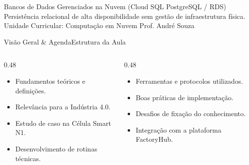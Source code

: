 
\senaicover
  {Bancos de Dados Gerenciados na Nuvem (Cloud SQL PostgreSQL / RDS)}
  {Persistência relacional de alta disponibilidade sem gestão de infraestrutura física.}
  {Unidade Curricular: Computação em Nuvem}
  {Prof. André Souza}

\begin{senaiframe}{Visão Geral \& Agenda}{Estrutura da Aula}
  \begin{columns}[t]
    \begin{column}{0.48\textwidth}
      \begin{tcolorbox}[senaibluecard, title={1. Conceitos Chave}]
        \begin{itemize}
          \item Fundamentos teóricos e definições.
          \item Relevância para a Indústria 4.0.
        \end{itemize}
      \end{tcolorbox}
      \vspace{4pt}
      \begin{tcolorbox}[senaiambercard, title={3. Aplicação Prática}]
        \begin{itemize}
          \item Estudo de caso na Célula Smart N1.
          \item Desenvolvimento de rotinas técnicas.
        \end{itemize}
      \end{tcolorbox}
    \end{column}
    \begin{column}{0.48\textwidth}
      \begin{tcolorbox}[senairedcard, title={2. Detalhamento Técnico}]
        \begin{itemize}
          \item Ferramentas e protocolos utilizados.
          \item Boas práticas de implementação.
        \end{itemize}
      \end{tcolorbox}
      \vspace{4pt}
      \begin{tcolorbox}[senaigreencard, title={4. Exercícios \& Avaliação}]
        \begin{itemize}
          \item Desafios de fixação do conhecimento.
          \item Integração com a plataforma FactoryHub.
        \end{itemize}
      \end{tcolorbox}
    \end{column}
  \end{columns}
\end{senaiframe}

